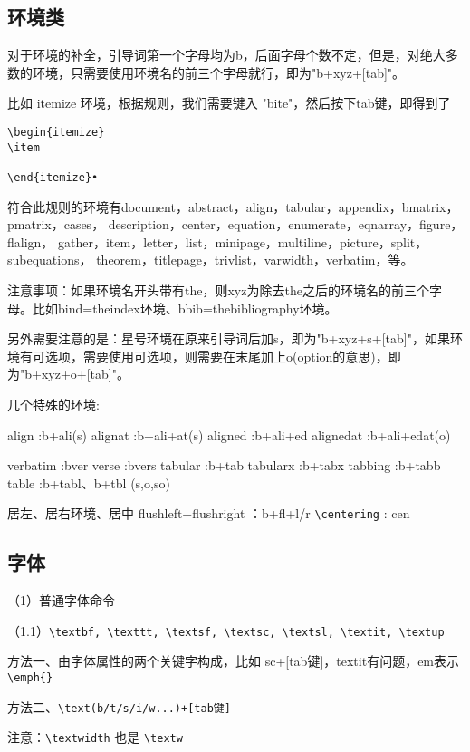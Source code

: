 \subsection{环境类}
对于环境的补全，引导词第一个字母均为b，后面字母个数不定，但是，对绝大多数的环境，只需要使用环境名的前三个字母就行，即为"b+xyz+[tab]"。
 
比如 itemize 环境，根据规则，我们需要键入 "bite"，然后按下tab键，即得到了
\begin{verbatim}
\begin{itemize}
\item
 
\end{itemize}•	
\end{verbatim}

符合此规则的环境有document，abstract，align，tabular，appendix，bmatrix，pmatrix，cases，
description，center，equation，enumerate，eqnarray，figure，flalign，
gather，item，letter，list，minipage，multiline，picture，split，subequations，
theorem，titlepage，trivlist，varwidth，verbatim，等。
 
注意事项：如果环境名开头带有the，则xyz为除去the之后的环境名的前三个字母。比如bind=theindex环境、bbib=thebibliography环境。
 
另外需要注意的是：星号环境在原来引导词后加s，即为"b+xyz+s+[tab]"，如果环境有可选项，需要使用可选项，则需要在末尾加上o(option的意思)，即为"b+xyz+o+[tab]"。
 
几个特殊的环境:

align    :b+ali(s)
alignat   :b+ali+at(s)
aligned  :b+ali+ed
alignedat :b+ali+edat(o)
 
verbatim  :bver
verse    :bvers
tabular   :b+tab
tabularx  :b+tabx
tabbing  :b+tabb
table    :b+tabl、b+tbl (s,o,so)
 
居左、居右环境、居中
flushleft+flushright ：b+fl+l/r
\verb|\centering|         : cen
 
 
 
 \subsection{字体}
（1）普通字体命令

（1.1）\verb|\textbf, \texttt, \textsf, \textsc, \textsl, \textit, \textup|

   方法一、由字体属性的两个关键字构成，比如 sc+[tab键]，textit有问题，em表示\verb|\emph{}|
   
   方法二、\verb|\text(b/t/s/i/w...)+[tab键]|
   
   注意：\verb|\textwidth| 也是 \verb|\textw|

